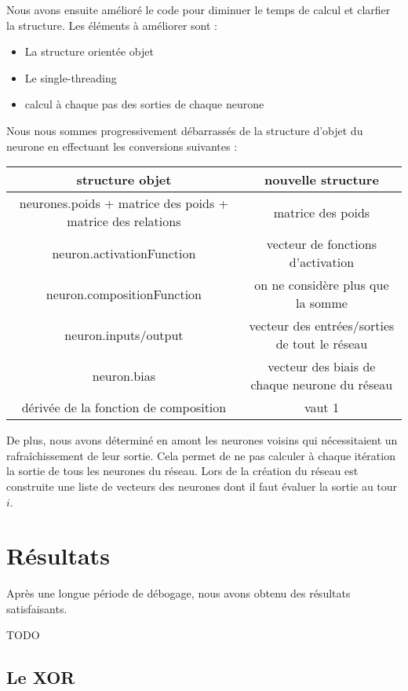 Nous avons ensuite amélioré le code pour diminuer le temps de calcul et clarfier
la structure. Les éléments à améliorer sont :
\begin{itemize}
\item La structure orientée objet
\item Le single-threading
\item calcul à chaque pas des sorties de chaque neurone
\end{itemize}

\medskip

Nous nous sommes progressivement débarrassés de la structure d'objet du neurone
en effectuant les conversions suivantes :

\medskip

\begin{tabular}{c|c}
   structure objet & nouvelle structure \\
   \hline
   neurones.poids + matrice des poids + matrice des relations & matrice des poids \\
   neuron.activationFunction & vecteur de fonctions d'activation \\
   neuron.compositionFunction & on ne considère plus que la somme \\
   neuron.inputs/output & vecteur des entrées/sorties de tout le réseau \\
   neuron.bias & vecteur des biais de chaque neurone du réseau \\
   dérivée de la fonction de composition & vaut 1
\end{tabular}

\medskip

De plus, nous avons déterminé en amont les neurones voisins qui nécessitaient
un rafraîchissement de leur sortie. Cela permet de ne pas calculer à chaque
itération la sortie de tous les neurones du réseau. Lors de la création du
réseau est construite une liste de vecteurs des neurones dont il faut évaluer
la sortie au tour $i$.

\section{Résultats}

Après une longue période de débogage, nous avons obtenu des résultats
satisfaisants.

TODO

\subsection{Le XOR}

